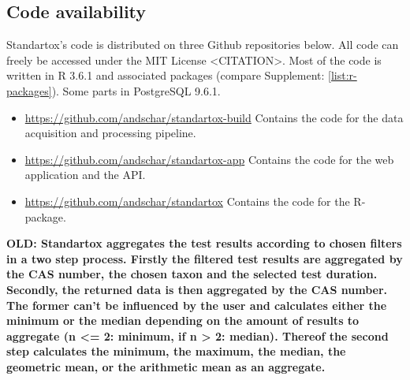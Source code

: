 \subsection*{Code availability}

Standartox's code is distributed on three Github repositories below. All code can freely be accessed under the MIT License <CITATION>. Most of the code is written in R 3.6.1 and associated packages (compare Supplement: \ref{list:r-packages}). Some parts in PostgreSQL 9.6.1.

\begin{itemize}

\item \url{https://github.com/andschar/standartox-build} \newline
Contains the code for the data acquisition and processing pipeline.

\item \url{https://github.com/andschar/standartox-app} \newline
Contains the code for the web application and the API.

\item \url{https://github.com/andschar/standartox} \newline
Contains the code for the R-package.

\end{itemize}

\textbf{OLD: Standartox aggregates the test results according to chosen filters in a two step process. Firstly the filtered test results are aggregated by the CAS number, the chosen taxon and the selected test duration. Secondly, the returned data is then aggregated by the CAS number. The former can't be influenced by the user and calculates either the minimum or the median depending on the amount of results to aggregate (n <= 2: minimum, if n > 2: median). Thereof the second step calculates the minimum, the maximum, the median, the geometric mean, or the arithmetic mean as an aggregate.}


